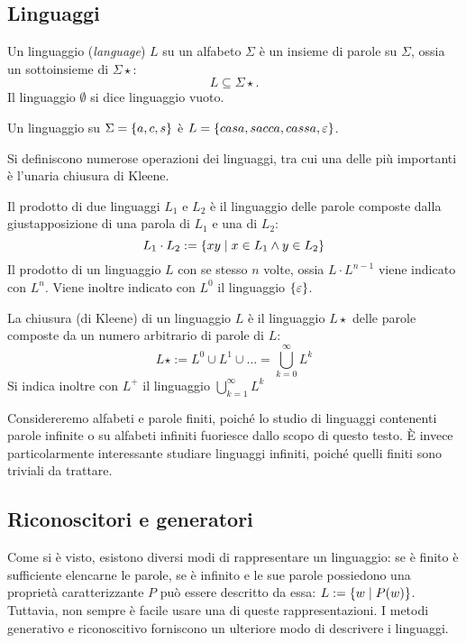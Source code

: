\subsection*{Linguaggi}
\begin{defin}[linguaggio]
	Un linguaggio (\emph{language}) $L$ su un alfabeto $\Sigma$ è un insieme di parole su $\Sigma$, ossia un sottoinsieme di $\Sigma\star$:
	\begin{equation*}
		L\subseteq\Sigma\star.
	\end{equation*}
	Il linguaggio $\emptyset$ si dice linguaggio vuoto.
\end{defin}
\begin{examp}
	Un linguaggio su $\Sigma=\left\{ a,c,s \right\}$ è $L=\left\{ casa, sacca, cassa, \varepsilon \right\}$.
\end{examp}
Si definiscono numerose operazioni dei linguaggi, tra cui una delle più importanti è l'unaria chiusura di Kleene.
\begin{defin}
	Il prodotto di due linguaggi $L_1$ e $L_2$ è il linguaggio delle parole composte dalla giustapposizione di una parola di $L_1$ e una di $L_2$:
	\begin{equation*}
		L_1\cdot L_2 := \left\{ xy\mid x\in L_1 \land y\in L_2 \right\}
	\end{equation*}
	Il prodotto di un linguaggio $L$ con se stesso $n$ volte, ossia $L\cdot L^{n-1}$ viene indicato con $L^n$. Viene inoltre indicato con $L^0$ il linguaggio $\left\{ \varepsilon \right\}$.
\end{defin}
\begin{defin}
	La chiusura (di Kleene) di un linguaggio $L$ è il linguaggio $L\star$ delle parole composte da un numero arbitrario di parole di $L$:
	\begin{equation*}
		L\star := L^0\cup L^1\cup\dots=\bigcup_{k=0}^\infty L^k
	\end{equation*}
	Si indica inoltre con $L^+$ il linguaggio $\bigcup_{k=1}^\infty L^k$
\end{defin}

Considereremo alfabeti e parole finiti, poiché lo studio di linguaggi contenenti parole infinite o su alfabeti infiniti fuoriesce dallo scopo di questo testo. È invece particolarmente interessante studiare linguaggi infiniti, poiché quelli finiti sono triviali da trattare.


\subsection*{Riconoscitori e generatori}
Come si è visto, esistono diversi modi di rappresentare un linguaggio: se è finito è sufficiente elencarne le parole, se è infinito e le sue parole possiedono una proprietà caratterizzante $P$ può essere descritto da essa: $L:=\left\{ w\mid P(w) \right\}$. Tuttavia, non sempre è facile usare una di queste rappresentazioni. I metodi generativo e riconoscitivo forniscono un ulteriore modo di descrivere i linguaggi.

